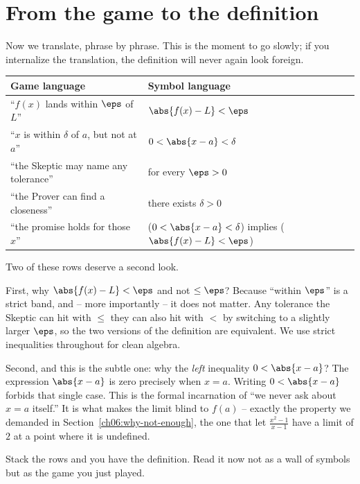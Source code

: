 \section{From the game to the definition}
\label{ch06:translate}

Now we translate, phrase by phrase. This is the moment to go slowly; if you
internalize the translation, the definition will never again look foreign.

\begin{center}
\renewcommand{\arraystretch}{1.5}
\begin{tabular}{@{}p{6.3cm}@{\quad$\Longleftrightarrow$\quad}p{6.1cm}@{}}
\toprule
\textbf{Game language} & \textbf{Symbol language} \\
\midrule
``$f(x)$ lands within $\eps$ of $L$'' & $\abs{f(x) - L} < \eps$ \\
``$x$ is within $\delta$ of $a$, but not at $a$'' & $0 < \abs{x - a} < \delta$ \\
``the Skeptic may name any tolerance'' & for every $\eps > 0$ \\
``the Prover can find a closeness'' & there exists $\delta > 0$ \\
``the promise holds for those $x$'' & ($0<\abs{x-a}<\delta$) implies ($\abs{f(x)-L}<\eps$) \\
\bottomrule
\end{tabular}
\end{center}

Two of these rows deserve a second look.

First, why $\abs{f(x)-L} < \eps$ and not $\le \eps$? Because ``within
$\eps$'' is a strict band, and -- more importantly -- it does not matter. Any
tolerance the Skeptic can hit with $\le$ they can also hit with $<$ by switching
to a slightly larger $\eps$, so the two versions of the definition are
equivalent. We use strict inequalities throughout for clean algebra.

Second, and this is the subtle one: why the \emph{left} inequality
$0 < \abs{x-a}$? The expression $\abs{x-a}$ is zero precisely when $x = a$.
Writing $0 < \abs{x-a}$ forbids that single case. This is the formal incarnation
of ``we never ask about $x = a$ itself.'' It is what makes the limit blind to
$f(a)$ -- exactly the property we demanded in
Section~\ref{ch06:why-not-enough}, the one that let
$\frac{x^2-1}{x-1}$ have a limit of $2$ at a point where it is undefined.

Stack the rows and you have the definition. Read it now not as a wall of
symbols but as the game you just played.

